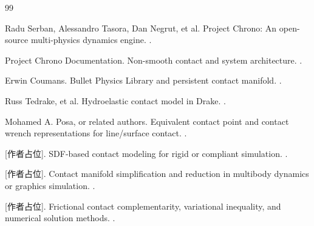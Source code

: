 \begin{thebibliography}{99}

Radu Serban, Alessandro Tasora, Dan Negrut, et al.
\newblock Project Chrono: An open-source multi-physics dynamics engine.
.

Project Chrono Documentation.
\newblock Non-smooth contact and system architecture.
.

Erwin Coumans.
\newblock Bullet Physics Library and persistent contact manifold.
.

Russ Tedrake, et al.
\newblock Hydroelastic contact model in Drake.
.

Mohamed A. Posa, or related authors.
\newblock Equivalent contact point and contact wrench representations for line/surface contact.
.

[作者占位].
\newblock SDF-based contact modeling for rigid or compliant simulation.
.

[作者占位].
\newblock Contact manifold simplification and reduction in multibody dynamics or graphics simulation.
\newblock [占位：补充接触流形约化相关论文].

[作者占位].
\newblock Frictional contact complementarity, variational inequality, and numerical solution methods.
.

\end{thebibliography}
